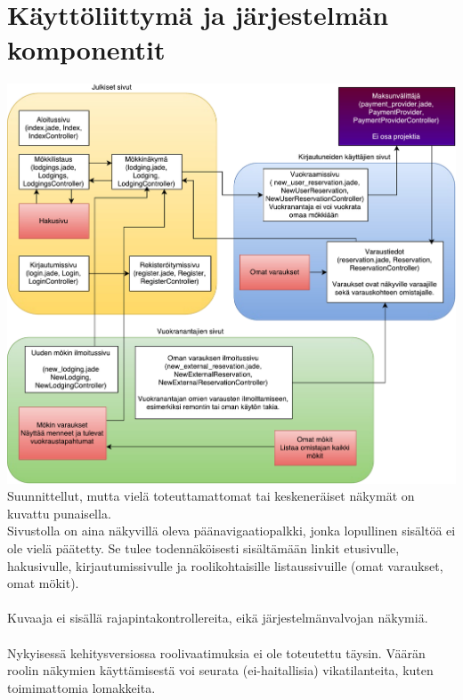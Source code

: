 \chapter{Käyttöliittymä ja järjestelmän komponentit}

\includegraphics[width = 14cm]{./diagrams/view_architecture.pdf}
\noindent
Suunnittellut, mutta vielä toteuttamattomat tai keskeneräiset näkymät on kuvattu punaisella.\\
Sivustolla on aina näkyvillä oleva päänavigaatiopalkki, jonka lopullinen sisältöä ei ole vielä päätetty. Se tulee todennäköisesti sisältämään linkit etusivulle, hakusivulle, kirjautumissivulle ja roolikohtaisille listaussivuille (omat varaukset, omat mökit).\\\\
Kuvaaja ei sisällä rajapintakontrollereita, eikä järjestelmänvalvojan näkymiä.\\\\
Nykyisessä kehitysversiossa roolivaatimuksia ei ole toteutettu täysin. Väärän roolin näkymien käyttämisestä voi seurata (ei-haitallisia) vikatilanteita, kuten toimimattomia lomakkeita.